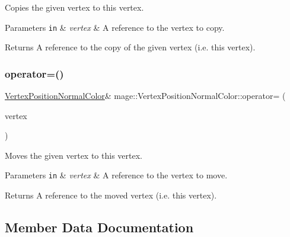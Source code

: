 Copies the given vertex to this vertex.


\begin{DoxyParams}[1]{Parameters}
\mbox{\tt in}  & {\em vertex} & A reference to the vertex to copy. \\
\hline
\end{DoxyParams}
\begin{DoxyReturn}{Returns}
A reference to the copy of the given vertex (i.\+e. this vertex). 
\end{DoxyReturn}
\hypertarget{structmage_1_1_vertex_position_normal_color_a81420d3cad27061049fe23bf4aaba64f}{}\label{structmage_1_1_vertex_position_normal_color_a81420d3cad27061049fe23bf4aaba64f} 
\subsubsection{\texorpdfstring{operator=()}{operator=()}\hspace{0.1cm}{\footnotesize\ttfamily [2/2]}}
{\footnotesize\ttfamily \hyperlink{structmage_1_1_vertex_position_normal_color}{Vertex\+Position\+Normal\+Color}\& mage\+::\+Vertex\+Position\+Normal\+Color\+::operator= (\begin{DoxyParamCaption}\item[{\hyperlink{structmage_1_1_vertex_position_normal_color}{Vertex\+Position\+Normal\+Color} \&\&}]{vertex }\end{DoxyParamCaption})\hspace{0.3cm}{\ttfamily [default]}}

Moves the given vertex to this vertex.


\begin{DoxyParams}[1]{Parameters}
\mbox{\tt in}  & {\em vertex} & A reference to the vertex to move. \\
\hline
\end{DoxyParams}
\begin{DoxyReturn}{Returns}
A reference to the moved vertex (i.\+e. this vertex). 
\end{DoxyReturn}


\subsection{Member Data Documentation}
\hypertarget{structmage_1_1_vertex_position_normal_color_a0d170b26a78b179330ae282ce97a036b}{}\label{structmage_1_1_vertex_position_normal_color_a0d170b26a78b179330ae282ce97a036b} 

